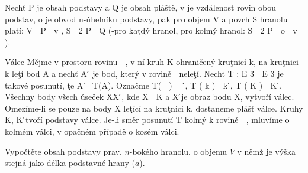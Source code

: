\V Nechť P je obsah podstavy a Q je obsah pláště, v je vzdálenost rovin obou podstav, o je
obvod n-úhelníku podstavy, pak pro objem V a povch S hranolu platí:
V  P  v , S  2 P  Q (-pro kaţdý hranol, pro kolmý hranol: S  2 P  o  v ).

\Def Válec
Mějme v prostoru rovinu  , v ní kruh
K ohraničený kruţnicí k, na kruţnici
k leţí bod A a nechť A ́ je bod, který
v rovině  neleţí. Nechť T : E 3  E 3 je
takové posunutí, ţe A ́=T(A). Označme
T(  )    ́, T ( k )  k  ́, T ( K )  K  ́.
Všechny body všech úseček XX ́, kde
X  K a X ́je obraz bodu X, vytvoří
válec. Omezíme-li se pouze na body X
leţící na kruţnici k, dostaneme plášť
válce. Kruhy K, K ́tvoří podstavy válce. Je-li směr posunutí T kolmý k rovině  , mluvíme
o kolmém válci, v opačném případě o kosém válci.

\Pr
Vypočtěte obsah podstavy prav. $n$-bokého hranolu, o objemu $V$ v němž je výška stejná jako délka podstavné hrany ($a$).

	

\EndDoc



